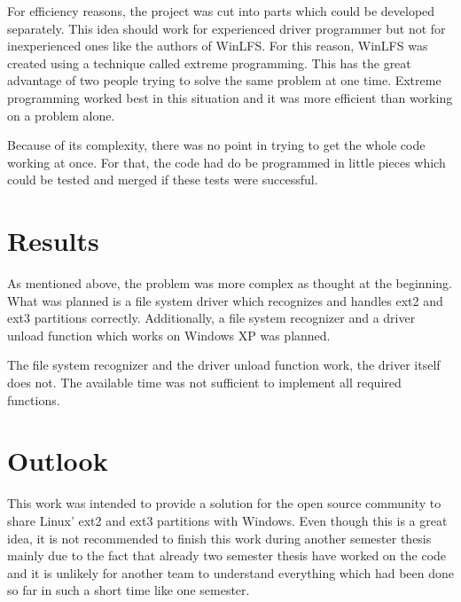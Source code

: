 For efficiency reasons, the project was cut into parts which could be developed separately. This idea should work for experienced driver programmer but not for inexperienced ones like the authors of WinLFS. For this reason, WinLFS was created using a technique called extreme programming. This has the great advantage of two people trying to solve the same problem at one time. Extreme programming worked best in this situation and it was more efficient than working on a problem alone.

Because of its complexity, there was no point in trying to get the whole code working at once. For that, the code had do be programmed in little pieces which could be tested and merged if these tests were successful.

\section*{Results}
As mentioned above, the problem was more complex as thought at the beginning. What was planned is a file system driver which recognizes and handles ext2 and ext3 partitions correctly. Additionally, a file system recognizer and a driver unload function which works on Windows XP was planned. 

The file system recognizer and the driver unload function work, the driver itself does not. The available time was not sufficient to implement all required functions.

\section*{Outlook}
This work was intended to provide a solution for the open source community to share Linux' ext2 and ext3 partitions with Windows. Even though this is a great idea, it is not recommended to finish this work during another semester thesis mainly due to the fact that already two semester thesis have worked on the code and it is unlikely for another team to understand everything which had been done so far in such a short time like one semester. 

